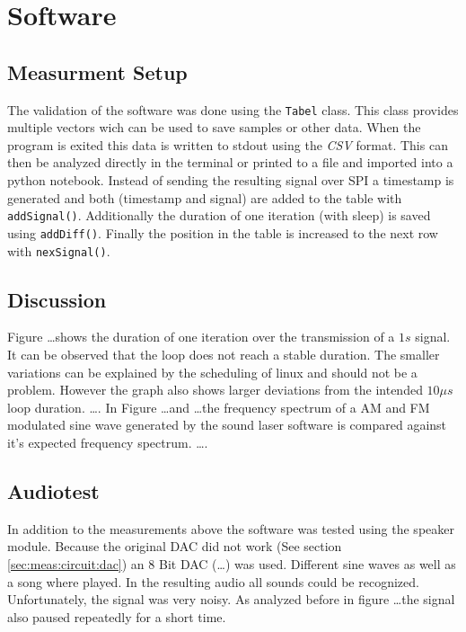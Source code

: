 \section{Software}

\subsection{Measurment Setup}

The validation of the software was done using the \lstinline{Tabel} class. This class provides multiple vectors wich can be used to save samples or other data. When the program is exited this data is written to stdout using the \textit{CSV} format. This can then be analyzed directly in the terminal or printed to a file and imported into a python notebook.\p
%
Instead of sending the resulting signal over SPI a timestamp is generated and both (timestamp and signal) are added to the table with \lstinline{addSignal()}. Additionally the duration of one iteration (with sleep) is saved using \lstinline{addDiff()}. Finally the position in the table is increased to the next row with \lstinline{nexSignal()}.

\subsection{Discussion}

Figure \dots shows the duration of one iteration over the transmission of a $1s$ signal. It can be observed that the loop does not reach a stable duration. The smaller variations can be explained by the scheduling of linux and should not be a problem. However the graph also shows larger deviations from the intended $10\mu s$ loop duration. \dots.
%
In Figure \dots and \dots the frequency spectrum of a AM and FM modulated sine wave generated by the sound laser software is compared against it's expected frequency spectrum. \dots.
%
\subsection{Audiotest}

In addition to the measurements above the software was tested using the speaker module. Because the original DAC did not work (See section \ref{sec:meas:circuit:dac}) an 8 Bit DAC (\dots) was used. Different sine waves as well as a song where played. In the resulting audio all sounds could be recognized. Unfortunately, the signal was very noisy. As analyzed before in figure \dots the signal also paused repeatedly for a short time.